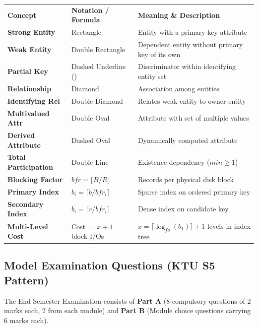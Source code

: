 \documentclass[11pt,a4paper]{article}
\newenvironment{Warn}[1][Important Exam Alert]{\begin{tcolorbox}[warnbox, title=#1]}{\end{tcolorbox}}
\begin{document}
\begin{center}
\small
\begin{tabularx}{\textwidth}{L{3.2cm} L{4.5cm} X}
  \color{white}\textbf{Concept} & \color{white}\textbf{Notation / Formula} & \color{white}\textbf{Meaning \& Description} \\
   \textbf{Strong Entity} & Rectangle & Entity with a primary key attribute \\
  \textbf{Weak Entity} & Double Rectangle & Dependent entity without primary key of its own \\
   \textbf{Partial Key} & Dashed Underline () & Discriminator within identifying entity set \\
  \textbf{Relationship} & Diamond & Association among entities \\
   \textbf{Identifying Rel} & Double Diamond & Relates weak entity to owner entity \\
  \textbf{Multivalued Attr} & Double Oval & Attribute with set of multiple values \\
   \textbf{Derived Attribute} & Dashed Oval & Dynamically computed attribute \\
  \textbf{Total Participation} & Double Line & Existence dependency ($min \ge 1$) \\
   \textbf{Blocking Factor} & $bfr = \lfloor B / R \rfloor$ & Records per physical disk block \\
  \textbf{Primary Index} & $b_i = \lceil b / bfr_i \rceil$ & Sparse index on ordered primary key \\
   \textbf{Secondary Index} & $b_i = \lceil r / bfr_i \rceil$ & Dense index on candidate key \\
  \textbf{Multi-Level Cost} & Cost $= x + 1$ block I/Os & $x = \lceil \log_{fo}(b_1) \rceil + 1$ levels in index tree \\
\end{tabularx}
\end{center}

\subsection{Model Examination Questions (KTU S5 Pattern)}

\begin{Warn}[University Examination Pattern (PBEOT504 Scheme)]
The End Semester Examination consists of \textbf{Part A} (8 compulsory questions of 2 marks each, 2 from each module) and \textbf{Part B} (Module choice questions carrying 6 marks each).
\end{Warn}
\end{document}

